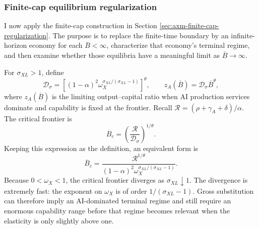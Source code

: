 \subsubsection{Finite-cap equilibrium regularization}
\label{sec:axm-finite-cap-gross-substitutes}

I now apply the finite-cap construction in Section
\ref{sec:axm-finite-cap-regularization}. The purpose is to replace the
finite-time boundary by an infinite-horizon economy for each
\(\overline B<\infty\), characterize that economy's terminal regime, and then
examine whether those equilibria have a meaningful limit as
\(\overline B\to\infty\).

For \(\sigma_{XL}>1\), define
\begin{equation}
 \mathcal D_\sigma=
 \left[(1-\alpha)^2
 \omega_X^{\sigma_{XL}/(\sigma_{XL}-1)}\right]^\theta,
 \qquad
 z_A(\overline B)=\mathcal D_\sigma\overline B^\theta,
 \label{eq:axm-capped-ai-only-productivity}
\end{equation}
where \(z_A(\overline B)\) is the limiting output--capital ratio when AI
production services dominate and capability is fixed at the frontier. Recall
\(\mathcal R=(\rho+\gamma_A+\delta)/\alpha\). The critical frontier is
\begin{equation}
 \overline B_c=
 \left(\frac{\mathcal R}{\mathcal D_\sigma}\right)^{1/\theta}.
 \label{eq:axm-critical-capability-frontier}
\end{equation}
Keeping this expression as the definition, an equivalent form is
\begin{equation}
 \overline B_c=
 \frac{\mathcal R^{1/\theta}}
 {(1-\alpha)^2
  \omega_X^{\sigma_{XL}/(\sigma_{XL}-1)}}.
 \label{eq:axm-critical-capability-frontier-equivalent}
\end{equation}
Because \(0<\omega_X<1\), the critical frontier diverges as
\(\sigma_{XL}\downarrow1\). The divergence is extremely fast: the exponent on
\(\omega_X\) is of order \(1/(\sigma_{XL}-1)\). Gross substitution can
therefore imply an AI-dominated terminal regime and still require an enormous
capability range before that regime becomes relevant when the elasticity is
only slightly above one.

